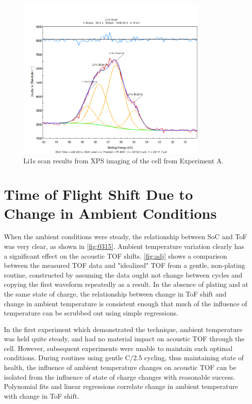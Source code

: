 \begin{figure}[h!]\label{fig:xps}
    \includegraphics[width=0.85\textwidth]{Thesis/xps.png}
    \centering
    \caption{Li1s scan results from XPS imaging of the cell from Experiment A.}
\end{figure}

\section{Time of Flight Shift Due to Change in Ambient Conditions}
When the ambient conditions were steady, the relationship between SoC and ToF was very clear, as shown in \hyperref[fig:0315]{\cref{fig:0315}}. Ambient temperature variation clearly has a significant effect on the acoustic TOF shifts. \hyperref[fig:adj]{\cref{fig:adj}} shows a comparison between the measured TOF data and "idealized" TOF from a gentle, non-plating routine, constructed by assuming the data ought not change between cycles and copying the first waveform repeatedly as a result. In the absence of plating and at the same state of charge, the relationship between change in ToF shift and change in ambient temperature is consistent enough that much of the influence of temperature can be scrubbed out using simple regressions.

In the first experiment which demonstrated the technique, ambient temperature was held quite steady, and had no material impact on acoustic TOF through the cell. 
However, subsequent experiments were unable to maintain such optimal conditions.
During routines using gentle C/2.5 cycling, thus maintaining state of health, the influence of ambient temperature changes on acoustic TOF can be isolated from the influence of state of charge changes with reasonable success. 
Polynomial fits and linear regressions correlate change in ambient temperature with change in ToF shift. 

